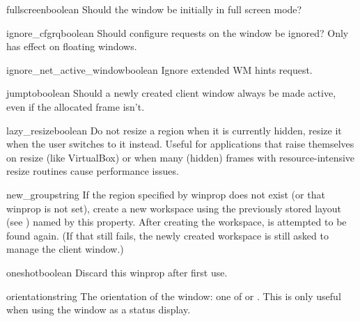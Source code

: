 \begin{winprop}{fullscreen}{boolean}
    Should the window be initially in full screen mode?
\end{winprop}


\begin{winprop}{ignore_cfgrq}{boolean}
    Should configure requests on the window be ignored?
    Only has effect on floating windows.
\end{winprop}


\begin{winprop}{ignore_net_active_window}{boolean}
    Ignore extended WM hints  request. 
\end{winprop}


\begin{winprop}{jumpto}{boolean}
    Should a newly created client window always be made
    active, even if the allocated frame isn't. 
\end{winprop}


\begin{winprop}{lazy_resize}{boolean}
    Do not resize a region when it is currently hidden,
    resize it when the user switches to it instead. Useful for
    applications that raise themselves on resize (like VirtualBox)
    or when many (hidden) frames with resource-intensive resize
    routines cause performance issues.
\end{winprop}


\begin{winprop}{new_group}{string}
    If the region specified by  winprop does not exist
    (or that winprop is not set), create a new workspace using the 
    previously stored layout (see ) named by
    this property. After creating the workspace,  is 
    attempted to be found again. (If that still fails, the newly 
    created workspace is still asked to manage the client window.)
\end{winprop}


\begin{winprop}{oneshot}{boolean}
    Discard this winprop after first use. 
\end{winprop}


\begin{winprop}{orientation}{string}
    The orientation of the window: one of  or
    . This is only useful when using the
    window as a status display.
\end{winprop}


